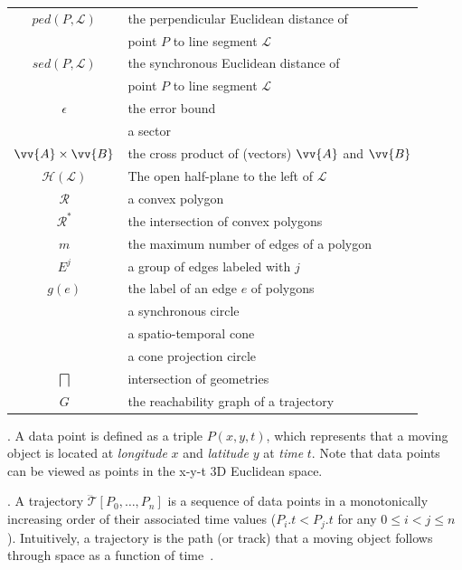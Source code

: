 \begin{table}
\begin{tabular}{|c|l|}
		\hline
		$ped(P, \mathcal{L})$ &  {the perpendicular Euclidean distance of }	\\
								& point $P$ to line segment $\mathcal{L}$	\\
		\hline
		$sed(P, \mathcal{L})$ & {the synchronous Euclidean distance of }	\\
								& point $P$ to line segment $\mathcal{L}$	\\
		\hline
		$\epsilon$ & the error bound \\
		\hline
		\sector{} & a sector \\
		\hline
		$\vv{A} \times \vv{B}$ & the cross product of (vectors) $\vv{A}$ and $\vv{B}$\\
		\hline
		$\mathcal{H}(\mathcal{L})$ & The open half-plane to the left of $\mathcal{L}$ \\
		\hline
		$\mathcal{R}$& a convex polygon \\
		\hline
		$\mathcal{R}^*$ & the intersection of convex polygons \\
		\hline
		$m$ & the maximum number of edges of a polygon\\
		\hline
		$E^j$ & a group of edges labeled with $j$\\
		\hline
		$g(e)$ & the label of an edge $e$ of polygons \\
		\hline
		\circle{} & a synchronous circle\\
		\hline
		\cone{} & a spatio-temporal cone \\
		\hline
		\pcircle{} & a cone projection circle \\
		\hline
		$\bigsqcap$ & intersection of geometries\\
		\hline
		$G$ &	the reachability graph of a trajectory\\
		\hline
	\end{tabular}
	\label{tab:notations}
	\vspace{-1ex}
\end{table}


. A data point is defined as a triple $P(x, y, t)$, which represents that a moving object is located at {\em longitude} $x$ and {\em latitude} $y$ at {\em time} $t$. Note that data points can be viewed as points in the x-y-t 3D Euclidean space.

. A trajectory $\dddot{\mathcal{T}}[P_0, \ldots, P_n]$ is a sequence of data points in a monotonically increasing order of their associated time values (\ie $P_i.t < P_j.t$ for any $0\le i<j\le n$). Intuitively, a trajectory is the path (or track) that a moving object follows through space as a function of time~\cite{physics-trajectory}.


